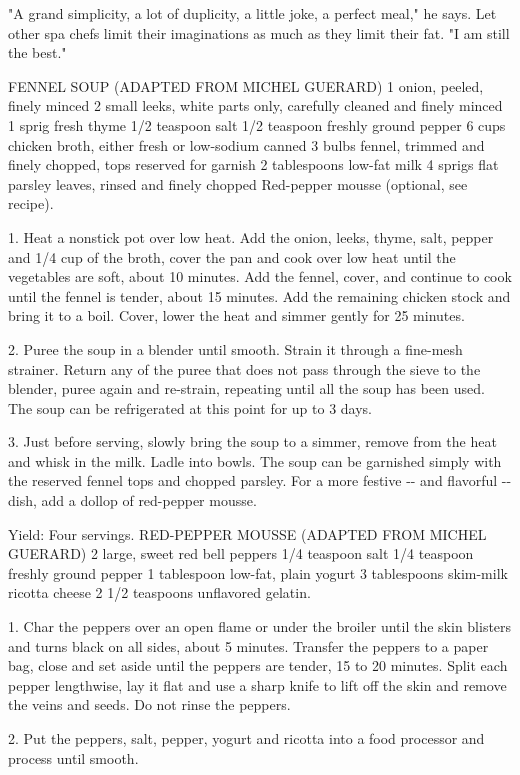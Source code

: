"A grand simplicity, a lot of duplicity, a little joke, a perfect meal,"
he says. Let other spa chefs limit their imaginations as much as they
limit their fat. "I am still the best."

FENNEL SOUP (ADAPTED FROM MICHEL GUERARD) 1 onion, peeled, finely minced
2 small leeks, white parts only, carefully cleaned and finely minced 1
sprig fresh thyme 1/2 teaspoon salt 1/2 teaspoon freshly ground pepper 6
cups chicken broth, either fresh or low-sodium canned 3 bulbs fennel,
trimmed and finely chopped, tops reserved for garnish 2 tablespoons
low-fat milk 4 sprigs flat parsley leaves, rinsed and finely chopped
Red-pepper mousse (optional, see recipe).

1. Heat a nonstick pot over low heat. Add the onion, leeks, thyme, salt,
pepper and 1/4 cup of the broth, cover the pan and cook over low heat
until the vegetables are soft, about 10 minutes. Add the fennel, cover,
and continue to cook until the fennel is tender, about 15 minutes. Add
the remaining chicken stock and bring it to a boil. Cover, lower the
heat and simmer gently for 25 minutes.

2. Puree the soup in a blender until smooth. Strain it through a
fine-mesh strainer. Return any of the puree that does not pass through
the sieve to the blender, puree again and re-strain, repeating until all
the soup has been used. The soup can be refrigerated at this point for
up to 3 days.

3. Just before serving, slowly bring the soup to a simmer, remove from
the heat and whisk in the milk. Ladle into bowls. The soup can be
garnished simply with the reserved fennel tops and chopped parsley. For
a more festive -\/- and flavorful -\/- dish, add a dollop of red-pepper
mousse.

Yield: Four servings. RED-PEPPER MOUSSE (ADAPTED FROM MICHEL GUERARD) 2
large, sweet red bell peppers 1/4 teaspoon salt 1/4 teaspoon freshly
ground pepper 1 tablespoon low-fat, plain yogurt 3 tablespoons skim-milk
ricotta cheese 2 1/2 teaspoons unflavored gelatin.

1. Char the peppers over an open flame or under the broiler until the
skin blisters and turns black on all sides, about 5 minutes. Transfer
the peppers to a paper bag, close and set aside until the peppers are
tender, 15 to 20 minutes. Split each pepper lengthwise, lay it flat and
use a sharp knife to lift off the skin and remove the veins and seeds.
Do not rinse the peppers.

2. Put the peppers, salt, pepper, yogurt and ricotta into a food
processor and process until smooth.

